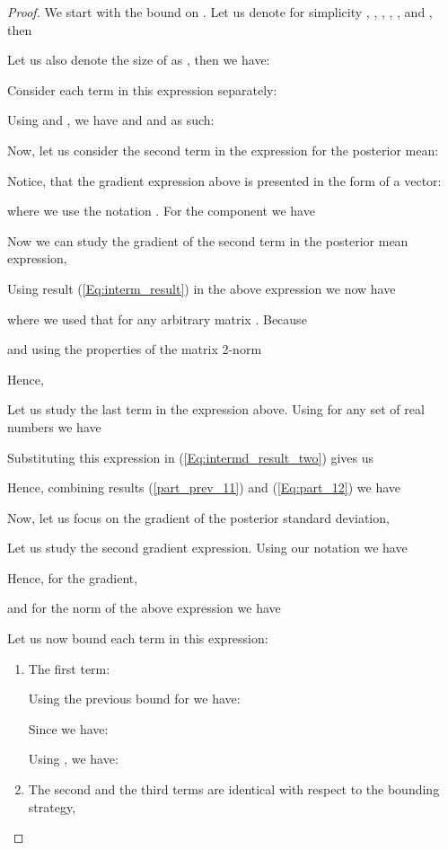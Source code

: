 \documentclass[jair,twoside,11pt,theapa]{article}
\theoremstyle{definition}
\begin{document}
\begin{proof}
We start with the bound on . Let us denote for simplicity , , ,  , , and , then

Let us also denote the size of  as , then we have:

Consider each term in this expression separately:

Using  and , we have  and  and as such:

Now, let us consider the second term in the expression for the posterior mean:

Notice, that the gradient expression above is presented in the form of a vector:

where we use the notation . For the  component we have

Now we can study the gradient of the second term in the posterior mean expression,

Using result (\ref{Eq:interm_result}) in the above expression we now have 

where we used that  for any arbitrary matrix . Because 

and using the properties of the matrix 2-norm


Hence,

Let us study the last term in the expression above. Using  for any set of real numbers  we have

Substituting this expression in (\ref{Eq:intermd_result_two}) gives us

Hence, combining results (\ref{part_prev_11}) and (\ref{Eq:part_12}) we have

Now, let us focus on the gradient of the posterior standard deviation,

Let us study the second gradient expression. Using our notation we have

Hence, for the gradient,

and for the norm of the above expression we have

Let us now bound each term in this expression:
\begin{enumerate}
    \item The first term:
    
    Using the previous bound for  we have:
    
    Since  we have:
    
    Using , we have:
    
    
    \item The second and the third terms are identical with respect to the bounding strategy,
    

\end{enumerate}
\end{proof}
\end{document}
